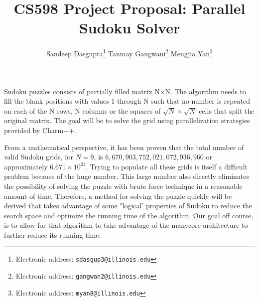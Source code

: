 \documentclass[10pt,twoside]{article}
\title{\textbf{ CS598 Project Proposal: Parallel Sudoku Solver}}
\author{Sandeep Dasgupta\thanks{Electronic address: \texttt{sdasgup3@illinois.edu}}
\qquad Tanmay Gangwani\thanks{Electronic address: \texttt{gangwan2@illinois.edu}}
\qquad  Mengjia Yan\thanks{Electronic address:
\texttt{myan8@illinois.edu}}}
\newcommand{\cmnt}[1]{}
\begin{document}
\thispagestyle{empty}

\maketitle

  Sudoku puzzles consists of partially filled matrix N×N. The algorithm needs
  to fill the blank positions with values 1 through N such that no number is
  repeated on each of the N rows, N columns or the squares of $\sqrt{N} \times
  \sqrt{N} $ cells that split the original matrix.  The goal will be to solve
  the grid using parallelization strategies provided by Charm++.

  From a mathematical perspective, it has been proven that the total number of
  valid Sudoku grids, for $N = 9$,  is $6,670,903,752,021,072,936,960$ or
  approximately $6.671 \times 10^{21}$.  Trying to populate all these grids is
  itself a difficult problem because of the huge number.  This large number
  also directly eliminates the possibility of solving the puzzle with brute
  force technique in a reasonable amount of time. Therefore, a method for
  solving the puzzle quickly will be derived that takes advantage of some
  "logical' properties of Sudoku to reduce the search space and optimize the
  running time of the algorithm. Our goal off course, is to allow for that
  algorithm to take advantage of the manycore architecture to further reduce
  its running time.  

\cmnt{
  On many occasions the humanistic algorithm returns a board with unfilled cells
  left, where they apply some brute force methods which involves some  heuristics
  to choose a value for a cell and see if that helps to solve a puzzle and many a times 
  that end up being wrong guess. To work around the problem, “backtracking” 
  ( or simply, undoing the puzzle 
      to a previous state just before the wrong guess is made and to  continue from there 
      by taking a different guess). Checkpoint/Restart
}
  
  



%
\end{document}
